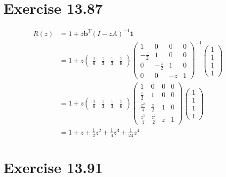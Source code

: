 \documentclass[a4paper]{article}
\begin{document}
\section*{Exercise 13.87}

\begin{equation}
    \begin{aligned}
        R(z) &= 1 + z\mathbf{b}^T (I-zA)^{-1}\mathbf{1} \\
        &= 1 + z 
        \begin{pmatrix}
            \frac{1}{6} & \frac{1}{3} & \frac{1}{3} & \frac{1}{6}
        \end{pmatrix}
        \begin{pmatrix}
            1 & 0 & 0 & 0 \\
            -\frac{z}{2} & 1 & 0 & 0 \\
            0 & -\frac{z}{2} & 1 & 0 \\
            0 & 0 & -z & 1
        \end{pmatrix}^{-1}
        \begin{pmatrix}
            1 \\ 1 \\ 1 \\ 1
        \end{pmatrix} \\
        &= 1 + z 
        \begin{pmatrix}
            \frac{1}{6} & \frac{1}{3} & \frac{1}{3} & \frac{1}{6}
        \end{pmatrix}
        \begin{pmatrix}
            1 & 0 & 0 & 0 \\
            \frac{z}{2} & 1 & 0 & 0 \\
            \frac{z^2}{4} & \frac{z}{2} & 1 & 0 \\
            \frac{z^3}{4} & \frac{z^2}{2} & z & 1
        \end{pmatrix}
        \begin{pmatrix}
            1 \\ 1 \\ 1 \\ 1
        \end{pmatrix} \\
        &= 1 + z + \frac{1}{2} z^2
        + \frac{1}{6} z^3 + \frac{1}{24} z^4
    \end{aligned}    
\end{equation}

\section*{Exercise 13.91}
\end{document}
